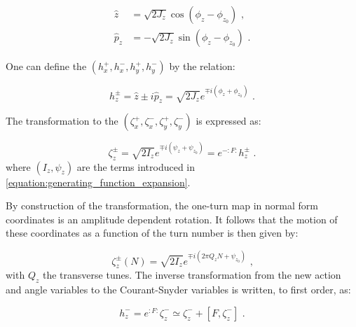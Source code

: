 \begin{equation}
    \begin{aligned}
        \hat{z}   &= \sqrt{2 J_z} \cos \left( \phi_z - \phi_{z_0} \right) \text{ ,} \\
        \hat{p}_z &= - \sqrt{2 J_z} \sin \left( \phi_z - \phi_{z_0} \right) \text{ .}
    \end{aligned}
    \label{equation:normalized_courant_snyder_coordinates_from_action_angle}
\end{equation}

One can define the  \(\left( h_x^{+}, h_x^{-}, h_y^{+}, h_y^{-} \right)\) by the relation:

\begin{equation}
    h_z^{\pm} = \hat{z} \pm i \hat{p}_z = \sqrt{2 J_z} e^{\mp i \left( \phi_z + \phi_{z_0} \right)} \text{ .}
    \label{equation:resonance_basis_definition}
\end{equation}

The transformation to the  \(\left( \zeta_x^{+}, \zeta_x^{-}, \zeta_y^{+}, \zeta_y^{-} \right)\) is expressed as:

\begin{equation}
    \zeta_z^{\pm} = \sqrt{2 I_z} e^{\mp i \left( \psi_z + \psi_{z_0} \right)} = e^{-:F:} h_z^{\pm} \text{ .}
    \label{equation:transformation_to_normal_form_coordinates_from_h_pm}
\end{equation}
where \((I_z, \psi_z)\) are the terms introduced in \cref{equation:generating_function_expansion}.

By construction of the transformation, the one-turn map in normal form coordinates is an amplitude dependent rotation.
It follows that the motion of these coordinates as a function of the turn number is then given by:

\begin{equation}
    \zeta_z^{\pm}(N) = \sqrt{2 I_z} e^{\mp i \left( 2 \pi Q_z N + \psi_{z_0} \right)} \text{ ,}
    \label{equation:normal_form_N_turn_expression}
\end{equation}
with \(Q_z\) the transverse tunes.
The inverse transformation from the new action and angle variables to the Courant-Snyder variables is written, to first order, as:

\begin{equation}
    h_z^{-} = e^{:F:} \zeta_z^{-} \simeq \zeta_z^{-} + \left[ F, \zeta_z^{-} \right] \text{ .}
    \label{equation:inverse_transformation_normal_form_to_courant_snyder_coordinates}
\end{equation}


